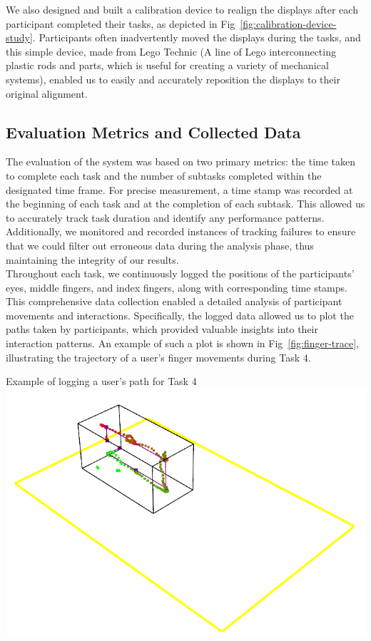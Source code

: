 We also designed and built a calibration device to realign the displays after each participant completed their tasks, as depicted in Fig~\ref{fig:calibration-device-study}. Participants often inadvertently moved the displays during the tasks, and this simple device, made from Lego Technic (A line of Lego interconnecting plastic rods and parts, which is useful for creating a variety of mechanical systems), enabled us to easily and accurately reposition the displays to their original alignment.

\subsection{Evaluation Metrics and Collected Data}

The evaluation of the system was based on two primary metrics: the time taken to complete each task and the number of subtasks completed within the designated time frame. For precise measurement, a time stamp was recorded at the beginning of each task and at the completion of each subtask. This allowed us to accurately track task duration and identify any performance patterns. Additionally, we monitored and recorded instances of tracking failures to ensure that we could filter out erroneous data during the analysis phase, thus maintaining the integrity of our results. \\

Throughout each task, we continuously logged the positions of the participants' eyes, middle fingers, and index fingers, along with corresponding time stamps. This comprehensive data collection enabled a detailed analysis of participant movements and interactions. Specifically, the logged data allowed us to plot the paths taken by participants, which provided valuable insights into their interaction patterns. An example of such a plot is shown in Fig~\ref{fig:finger-trace}, illustrating the trajectory of a user's finger movements during Task 4.

\begin{figureBox}[label={fig:finger-trace}, width=0.8\linewidth]{Example of logging a user's path for Task 4}
    \includegraphics[width = 0.8\linewidth]{./implementation/figures/finger-trace-plot.png}
\end{figureBox}

